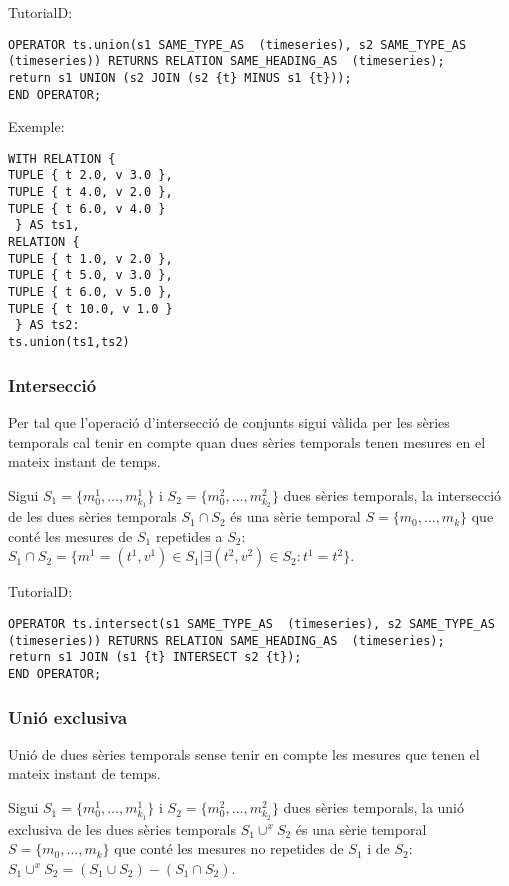 TutorialD:
\begin{verbatim}
OPERATOR ts.union(s1 SAME_TYPE_AS  (timeseries), s2 SAME_TYPE_AS  (timeseries)) RETURNS RELATION SAME_HEADING_AS  (timeseries);
return s1 UNION (s2 JOIN (s2 {t} MINUS s1 {t}));
END OPERATOR;
\end{verbatim}


Exemple:
\begin{verbatim}
WITH RELATION {
TUPLE { t 2.0, v 3.0 },
TUPLE { t 4.0, v 2.0 },
TUPLE { t 6.0, v 4.0 }
 } AS ts1,
RELATION {
TUPLE { t 1.0, v 2.0 },
TUPLE { t 5.0, v 3.0 },
TUPLE { t 6.0, v 5.0 },
TUPLE { t 10.0, v 1.0 }
 } AS ts2: 
ts.union(ts1,ts2)
\end{verbatim}



\subsubsection{Intersecció}

Per tal que l'operació d'intersecció de conjunts sigui vàlida per les sèries
temporals cal tenir en compte quan dues sèries temporals tenen mesures
en el mateix instant de temps.

\begin{definition}[intersecció]
  Sigui $S_1=\{m_0^1, \dotsc, m_{k_1}^1\}$ i $S_2=\{m_0^2, \dotsc,
  m_{k_2}^2\}$ dues sèries temporals, la intersecció de les dues
  sèries temporals $S_1 \cap S_2$ és una sèrie temporal $S=\{m_0,
  \dotsc, m_k\}$ que conté les mesures de $S_1$ repetides a $S_2$:
  $S_1 \cap S_2 = \{ m^1 = (t^1,v^1) \in S_1 | \exists (t^2,v^2)\in
  S_2 : t^1 = t^2\}$.
\end{definition}

TutorialD:
\begin{verbatim}
OPERATOR ts.intersect(s1 SAME_TYPE_AS  (timeseries), s2 SAME_TYPE_AS  (timeseries)) RETURNS RELATION SAME_HEADING_AS  (timeseries);
return s1 JOIN (s1 {t} INTERSECT s2 {t});
END OPERATOR;
\end{verbatim}




\subsubsection{Unió exclusiva}

Unió de dues sèries temporals sense tenir en compte les mesures que
tenen el mateix instant de temps.


\begin{definition}
  Sigui $S_1=\{m_0^1, \dotsc, m_{k_1}^1\}$ i $S_2=\{m_0^2, \dotsc,
  m_{k_2}^2\}$ dues sèries temporals, la unió exclusiva de les dues
  sèries temporals $S_1 \cup^x S_2$ és una sèrie temporal $S=\{m_0,
  \dotsc, m_k\}$ que conté les mesures no repetides de $S_1$ i de
  $S_2$: $S_1 \cup^x S_2 =  ( S_1 \cup S_2 ) - (S_1 \cap S_2)$.
\end{definition}


